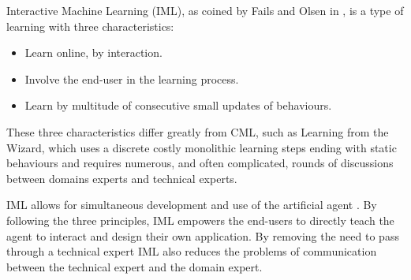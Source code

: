 \documentclass[manuscript, review, anonymous]{acmart}
\begin{document}

Interactive Machine Learning (IML), as coined by Fails and Olsen in
\cite{fails2003interactive}, is a type of learning with three characteristics:

\begin{itemize}
    \item Learn online, by interaction.
    \item Involve the end-user in the learning process.
    \item Learn by multitude of consecutive small updates of behaviours.
\end{itemize}

These three characteristics differ greatly from CML, such as Learning from the
Wizard, which uses a discrete costly monolithic learning steps ending with static
behaviours and requires numerous, and often complicated, rounds of discussions 
between domains experts and technical experts.

IML allows for simultaneous development and use of the artificial agent
\cite{amershi2014power}. By following the three principles, IML empowers the end-users 
to directly teach the agent to interact and design their own application. By removing 
the need to pass through a technical expert IML also reduces the problems of 
communication between the technical expert and the domain expert.



\end{document}
